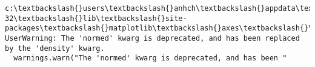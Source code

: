 \documentclass[11pt]{article}
\begin{document}
    \begin{Verbatim}[commandchars=\\\{\}]
c:\textbackslash{}users\textbackslash{}anhch\textbackslash{}appdata\textbackslash{}local\textbackslash{}programs\textbackslash{}python\textbackslash{}python36-32\textbackslash{}lib\textbackslash{}site-packages\textbackslash{}matplotlib\textbackslash{}axes\textbackslash{}\_axes.py:6571: UserWarning: The 'normed' kwarg is deprecated, and has been replaced by the 'density' kwarg.
  warnings.warn("The 'normed' kwarg is deprecated, and has been "

    \end{Verbatim}

    \begin{center}
    \end{center}
    { \hspace*{\fill} \\}
    
    \begin{center}
    \end{center}
    { \hspace*{\fill} \\}
    
    \begin{center}
    \end{center}
    { \hspace*{\fill} \\}
    
    \begin{center}
    \end{center}
    { \hspace*{\fill} \\}
    
    \begin{center}
    \end{center}
    { \hspace*{\fill} \\}
    
    \begin{center}
    \end{center}
    { \hspace*{\fill} \\}
    
\end{document}
